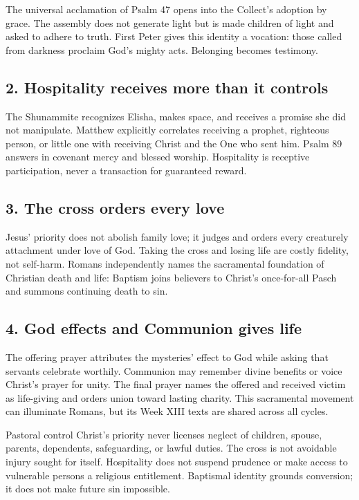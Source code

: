 \begin{deepstudy}
The universal acclamation of Psalm 47 opens into the Collect's adoption by grace. The assembly does not generate light but is made children of light and asked to adhere to truth. First Peter gives this identity a vocation: those called from darkness proclaim God's mighty acts. Belonging becomes testimony.

\subsection*{2. Hospitality receives more than it controls\enspace{}}

The Shunammite recognizes Elisha, makes space, and receives a promise she did not manipulate. Matthew explicitly correlates receiving a prophet, righteous person, or little one with receiving Christ and the One who sent him. Psalm 89 answers in covenant mercy and blessed worship. Hospitality is receptive participation, never a transaction for guaranteed reward.

\subsection*{3. The cross orders every love\enspace{}}

Jesus' priority does not abolish family love; it judges and orders every creaturely attachment under love of God. Taking the cross and losing life are costly fidelity, not self-harm. Romans independently names the sacramental foundation of Christian death and life: Baptism joins believers to Christ's once-for-all Pasch and summons continuing death to sin.

\subsection*{4. God effects and Communion gives life\enspace{}}

The offering prayer attributes the mysteries' effect to God while asking that servants celebrate worthily. Communion may remember divine benefits or voice Christ's prayer for unity. The final prayer names the offered and received victim as life-giving and orders union toward lasting charity. This sacramental movement can illuminate Romans, but its Week XIII texts are shared across all cycles.

\begin{studybox}{Pastoral control}
Christ's priority never licenses neglect of children, spouse, parents, dependents, safeguarding, or lawful duties. The cross is not avoidable injury sought for itself. Hospitality does not suspend prudence or make access to vulnerable persons a religious entitlement. Baptismal identity grounds conversion; it does not make future sin impossible.
\end{studybox}


\end{deepstudy}
